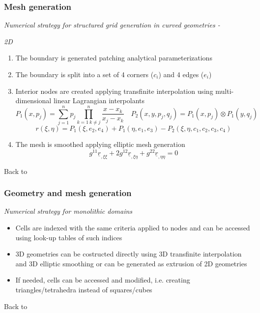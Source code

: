\documentclass[first,firstsupp,lastsupp,handout,last,hyperref,table]{ETHclass}
\begin{document}
\begin{frame}[label=2D_gen]
\frametitle{Mesh generation}
\vspace{-0.25cm}
\centering
{\footnotesize
\textit{Numerical strategy for structured grid generation in curved geometries - }}
{\scriptsize
\textit{2D}
\vspace{0.1cm}
\begin{enumerate}
\item The boundary is generated patching analytical parameterizations
\item The boundary is split into a set of 4 corners ($c_{i}$) and 4 edges ($e_{i}$)
\item Interior nodes are created applying transfinite interpolation using multi-dimensional linear Lagrangian interpolants
\begin{equation*}
P_{1}(x,p_{j})=\sum_{j=1}^{n}p_{j}\prod_{k=1\ k\neq j}^{n}\frac{x-x_{k}}{x_{j}-x_{k}}\quad P_{2}(x,y,p_{j},q_{j})=P_{1}(x,p_{j})\otimes P_{1}(y,q_{j})
\end{equation*}
\begin{equation*}
r(\xi,\eta)=P_{1}(\xi,e_{2},e_{4})+P_{1}(\eta,e_{1},e_{3})- P_{2}(\xi,\eta,c_{1},c_{2},c_{3},c_{4})
\end{equation*}
\item The mesh is smoothed applying elliptic mesh generation
\begin{equation*}
g^{11}\underline{r}_{,\xi\xi}+2g^{12}\underline{r}_{,\xi\eta}+g^{22}\underline{r}_{,\eta\eta}=0
\end{equation*}
\end{enumerate}
Back to \hyperlink{3D_gen}{}
}
\end{frame}
\begin{frame}[label=num_stra]
\frametitle{Geometry and mesh generation}
\centering
\textit{Numerical strategy for monolithic domains}
\vspace{0.1cm}
{\footnotesize
\begin{itemize}
\item Cells are indexed with the same criteria applied to nodes and can be accessed using look-up tables of such indices
\item 3D geometries can be costructed directly using 3D transfinite interpolation and 3D elliptic smoothing or can be generated as extrusion of 2D geometries
\item If needed, cells can be accessed and modified, i.e. creating triangles/tetrahedra instead of squares/cubes
\end{itemize}
}
{\small
\raggedleft
Back to \hyperlink{mesh2}{}
}
\end{frame}
\end{document}
